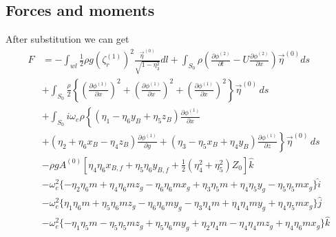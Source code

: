 \subsection{Forces and moments}
After substitution we can get 
\begin{align}     
    F &= -\int_{wl}\frac{1}{2}\rho g (\zeta_r^{(1)})^2 \frac{\vec{\eta}^{(0)}}{\sqrt{1-\eta_3^2}} dl + 
    \int_{S_0}\rho\left(\frac{\partial \phi^{(2)}}{\partial t} - U\frac{\partial \phi^{(2)}}{\partial x}\right)\vec{\eta}^{(0)}ds \\ \nonumber
    &+ \int_{S_0} \frac{\rho}{2}\left\{\left(\frac{\partial \phi^{(1)}}{\partial x}\right)^2 + \left(\frac{\partial \phi^{(1)}}{\partial x}\right)^2
    + \left(\frac{\partial \phi^{(1)}}{\partial x}\right)^2\right\}\vec{\eta}^{(0)} \,ds \\ \nonumber
    &+\int_{S_0}i\omega_e\rho\left\{(\eta_1-\eta_6y_B+\eta_5z_B)\frac{\partial \phi^{(1)}}{\partial x} \right. \\ \nonumber
    &\left. +(\eta_2+\eta_6x_B-\eta_4z_B)\frac{\partial \phi^{(1)}}{\partial y} + (\eta_3-\eta_5x_B+\eta_4y_B)
    \frac{\partial \phi^{(1)}}{\partial z}\right\}\vec{\eta}^{(0)} \,ds \\ \nonumber
    &- \rho g A^{(0)}\left[\eta_4 \eta_6 x_{B,f} + \eta_5\eta_6 y_{B,f} + \frac{1}{2}(\eta_4^2+\eta_5^2)Z_0\right]\hat{k} \\ \nonumber
    &-\omega^2_e\{-\eta_2\eta_6m + \eta_4\eta_6m z_g -\eta_6\eta_6 m x_g + \eta_3 \eta_5 m + \eta_4\eta_5y_g
    - \eta_5\eta_5 m x_g\} \hat{i} \\ \nonumber
    &-\omega^2_e\{\eta_1\eta_6m + \eta_5\eta_6m z_g -\eta_6\eta_6 m y_g - \eta_3 \eta_4 m + \eta_4 \eta_4 m y_g
    + \eta_4 \eta_5 m x_g\} \hat{j} \\ \nonumber
    &-\omega^2_e\{-\eta_1\eta_5 m - \eta_5\eta_5m z_g +\eta_5\eta_6 m y_g + \eta_2 \eta_4 m - \eta_4 \eta_4 m z_g
    + \eta_4 \eta_6 m x_g\} \hat{k}
\end{align}

